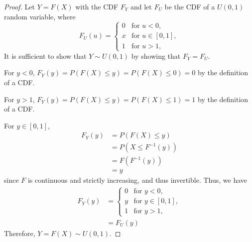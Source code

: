 \documentclass[
  coursecode={MTHE 455},
  assignmentname={Assignment \assignmentnumber},
  studentnumber=20053722,
  name={Bryan Hoang},
]{
  ltxanswer%
}
\begin{document}
  \begin{questions}
    \setcounter{question}{\questionnumber}
    \addtocounter{question}{-1}
    \question[5]\
    \begin{parts}
      \part{}
      \begin{solution}
        \begin{proof}
          Let \(Y=F(X)\) with the CDF \(F_{Y}\) and let \(F_{U}\) be the CDF of a \(U(0,1)\) random variable, where
          \begin{equation*}
            F_{U}(u) = \begin{cases}
              0 & \text{for } u < 0,        \\
              x & \text{for } u \in [0, 1], \\
              1 & \text{for } u > 1,
            \end{cases}
          \end{equation*}
          It is sufficient to show that \(Y \sim U(0,1)\) by showing that \(F_{Y} = F_{U}\).

          For \(y < 0\), \(F_{Y}(y) = P(F(X) \le y) = P(F(X) \le 0) = 0\) by the definition of a CDF.\@

          For \(y > 1\), \(F_{Y}(y) = P(F(X) \le y) = P(F(X) \le 1) = 1\) by the definition of a CDF.\@

          For \(y \in [0,1]\),
          \begin{align*}
            F_{Y}(y) &= P(F(X) \le y)      \\
                     &= P(X \le F^{-1}(y)) \\
                     &= F(F^{-1}(y))       \\
                     &= y
          \end{align*}
          since \(F\) is continuous and strictly increasing, and thus invertible. Thus, we have
          \begin{align*}
            F_{Y}(y) &= \begin{cases}
                          0 & \text{for } y < 0,        \\
                          y & \text{for } y \in [0, 1], \\
                          1 & \text{for } y > 1,
                        \end{cases} \\
                     &= F_{U}(y)
          \end{align*}
          Therefore, \(Y = F(X) \sim U(0,1)\).
        \end{proof}
      \end{solution}


\end{parts}
\end{questions}
\end{document}
